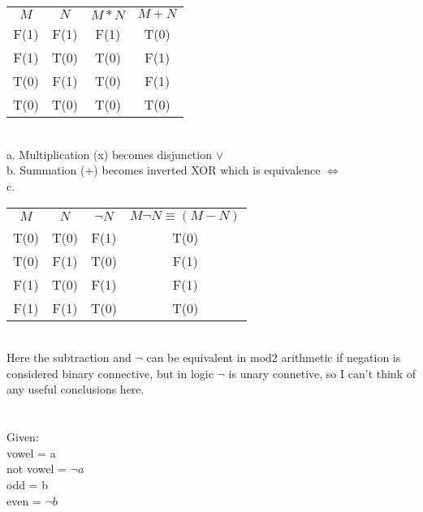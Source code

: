 \documentclass{article}
\begin{document}
\section{}
\begin{tabular}{ c c c c }
  $M$  & $N$  & $M * N$ & $M + N$ \\
  F(1) & F(1) & F(1)    & T(0)    \\
  F(1) & T(0) & T(0)    & F(1)    \\
  T(0) & F(1) & T(0)    & F(1)    \\
  T(0) & T(0) & T(0)    & T(0)    \\
\end{tabular} \\
a. Multiplication (x) becomes disjunction $\vee$ \\
b. Summation (+) becomes inverted XOR which is equivalence $\Leftrightarrow$ \\
c.
\begin{tabular}{ c c c c }
  $M$  & $N$  & $\neg N$ & $M \neg N \equiv (M - N)$ \\
  T(0) & T(0) & F(1)     & T(0)                             \\
  T(0) & F(1) & T(0)     & F(1)                             \\
  F(1) & T(0) & F(1)     & F(1)                             \\
  F(1) & F(1) & T(0)     & T(0)                             \\
\end{tabular} \\
Here the subtraction and $\neg$ can be equivalent in mod2 arithmetic if negation is considered binary connective, but in logic $\neg$ is unary connetive, so I can't think of any useful conclusions here. \\

\section{}
Given:\\
vowel = a \\
not vowel = $\neg a$ \\
odd = b \\
even = $\neg b$ \\
\end{document}
